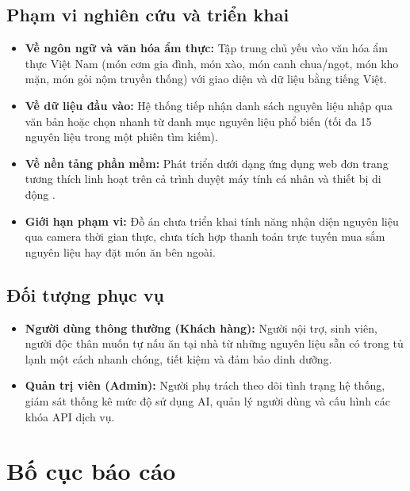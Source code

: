 \subsection{Phạm vi nghiên cứu và triển khai}
\begin{itemize}[leftmargin=1.6em, itemsep=2pt]
  \item \textbf{Về ngôn ngữ và văn hóa ẩm thực:} Tập trung chủ yếu vào văn hóa ẩm thực Việt Nam (món cơm gia đình, món xào, món canh chua/ngọt, món kho mặn, món gỏi nộm truyền thống) với giao diện và dữ liệu bằng tiếng Việt.
  \item \textbf{Về dữ liệu đầu vào:} Hệ thống tiếp nhận danh sách nguyên liệu nhập qua văn bản hoặc chọn nhanh từ danh mục nguyên liệu phổ biến (tối đa 15 nguyên liệu trong một phiên tìm kiếm).
  \item \textbf{Về nền tảng phần mềm:} Phát triển dưới dạng ứng dụng web đơn trang  tương thích linh hoạt trên cả trình duyệt máy tính cá nhân  và thiết bị di động .
  \item \textbf{Giới hạn phạm vi:} Đồ án chưa triển khai tính năng nhận diện nguyên liệu qua camera thời gian thực, chưa tích hợp thanh toán trực tuyến mua sắm nguyên liệu hay đặt món ăn bên ngoài.
\end{itemize}

\subsection{Đối tượng phục vụ}
\begin{itemize}[leftmargin=1.6em, itemsep=2pt]
  \item \textbf{Người dùng thông thường (Khách hàng):} Người nội trợ, sinh viên, người độc thân muốn tự nấu ăn tại nhà từ những nguyên liệu sẵn có trong tủ lạnh một cách nhanh chóng, tiết kiệm và đảm bảo dinh dưỡng.
  \item \textbf{Quản trị viên (Admin):} Người phụ trách theo dõi tình trạng hệ thống, giám sát thống kê mức độ sử dụng AI, quản lý người dùng và cấu hình các khóa API dịch vụ.
\end{itemize}

\section{Bố cục báo cáo}

